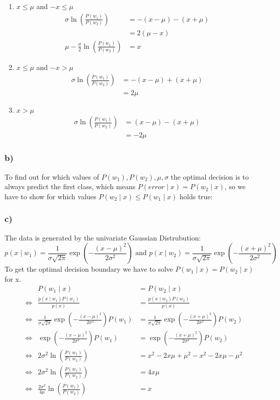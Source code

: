 \documentclass[10pt,a4paper]{article}
\begin{document}
\begin{enumerate}
	\item $x \le \mu$ and $-x \le \mu$ \\
		\begin{align*}
			\sigma\ln\left(\frac{P(w_1)}{P(w_2)}\right) &= -(x - \mu) - (x + \mu ) \\
			&= 2(\mu - x) \\
			\mu - \frac{\sigma}{2}\ln\left(\frac{P(w_1)}{P(w_2)}\right) &= x
		\end{align*}
	\item $x \le \mu$ and $-x > \mu$ \\
		\begin{align*}
			\sigma\ln\left(\frac{P(w_1)}{P(w_2)}\right) &= -(x - \mu) + (x + \mu ) \\
			&= 2\mu
		\end{align*}
	\item $x > \mu$ \\
		\begin{align*}
			\sigma\ln\left(\frac{P(w_1)}{P(w_2)}\right) &= (x - \mu) - (x + \mu ) \\
			&= -2\mu
		\end{align*}
\end{enumerate}
\subsubsection*{b)}
To find out for which values of $P(w_1), P(w_2), \mu, \sigma$ the optimal decision is to always predict the first class, which means $P(error \mid x) = P(w_2 \mid x)$, so we have to show for which values $P(w_2 \mid x) \le P(w_1 \mid x)$ holds true:

\subsubsection*{c)}
The data is generated by the univariate Gaussian Distrubution:
$$p(x\mid w_1) = \frac{1}{\sigma\sqrt{2\pi}}\exp\left(-\frac{(x - \mu)^2}{2\sigma^2}\right) \textrm{ and } p(x\mid w_2) = \frac{1}{\sigma\sqrt{2\pi}}\exp\left(-\frac{(x + \mu)^2}{2\sigma^2}\right)$$
To get the optimal decision boundary we have to solve $P(w_1\mid x) = P(w_2 \mid x)$ for x.
\begin{align*}
&& P(w_1 \mid x) &= P(w_2 \mid x) \\
&\Leftrightarrow &\frac{p(x \mid w_1)P(w_1)}{p(x)} &= \frac{p(x \mid w_2)P(w_2)}{p(x)} \\
&\Leftrightarrow &\frac{1}{\sigma\sqrt{2\pi}}\exp\left(-\frac{(x - \mu)^2}{2\sigma^2}\right)P(w_1) &= \frac{1}{\sigma\sqrt{2\pi}}\exp\left(-\frac{(x + \mu)^2}{2\sigma^2}\right)P(w_2) \\
&\Leftrightarrow &\exp\left(-\frac{(x - \mu)^2}{2\sigma^2}\right)P(w_1) &= \exp\left(-\frac{(x + \mu)^2}{2\sigma^2}\right)P(w_2) \\
&\Leftrightarrow &2\sigma^2\ln\left(\frac{P(w_1)}{P(w_2)}\right) &= x^2 - 2x\mu + \mu^2 - x^2 - 2x\mu - \mu^2 \\
&\Leftrightarrow &2\sigma^2\ln\left(\frac{P(w_1)}{P(w_2)}\right) &= 4x\mu \\
&\Leftrightarrow &\frac{2\sigma^2}{4\mu}\ln\left(\frac{P(w_1)}{P(w_2)}\right) &= x
\end{align*}
\end{document}
